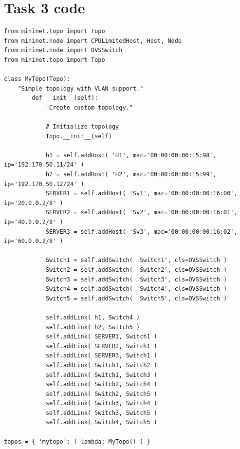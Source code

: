 \documentclass{article}
\begin{document}
\section{Task 3 code}
\begin{lstlisting}
from mininet.topo import Topo  
from mininet.node import CPULimitedHost, Host, Node
from mininet.node import OVSSwitch
from mininet.topo import Topo

class MyTopo(Topo):  
	"Simple topology with VLAN support."
    	def __init__(self):
        	"Create custom topology."

	        # Initialize topology
	        Topo.__init__(self)

	        h1 = self.addHost( 'H1', mac='00:00:00:00:15:98', ip='192.170.50.11/24' )
	        h2 = self.addHost( 'H2', mac='00:00:00:00:15:99', ip='192.170.50.12/24' )
	        SERVER1 = self.addHost( 'Sv1', mac='00:00:00:00:16:00', ip='20.0.0.2/8' )
	        SERVER2 = self.addHost( 'Sv2', mac='00:00:00:00:16:01', ip='40.0.0.2/8' )
	        SERVER3 = self.addHost( 'Sv3', mac='00:00:00:00:16:02', ip='60.0.0.2/8' )

	        Switch1 = self.addSwitch( 'Switch1', cls=OVSSwitch )
	        Switch2 = self.addSwitch( 'Switch2', cls=OVSSwitch )
	        Switch3 = self.addSwitch( 'Switch3', cls=OVSSwitch )
	        Switch4 = self.addSwitch( 'Switch4', cls=OVSSwitch )
	        Switch5 = self.addSwitch( 'Switch5', cls=OVSSwitch )

	        self.addLink( h1, Switch4 )
	        self.addLink( h2, Switch5 )
	        self.addLink( SERVER1, Switch1 )
	        self.addLink( SERVER2, Switch1 )
	        self.addLink( SERVER3, Switch1 )
	        self.addLink( Switch1, Switch2 )
	        self.addLink( Switch1, Switch3 )
	        self.addLink( Switch2, Switch4 )
	        self.addLink( Switch2, Switch5 )
	        self.addLink( Switch3, Switch4 )
	        self.addLink( Switch3, Switch5 )
	        self.addLink( Switch4, Switch5 )

topos = { 'mytopo': ( lambda: MyTopo() ) }
\end{lstlisting}

\newpage
\end{document}
